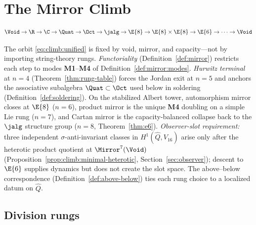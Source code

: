 \section{The Mirror Climb}
\label{sec:climb}

\begin{equation}\label{eq:climb:unified}
  \Void\to\R\to\C\to\Quat\to\Oct\to\jalg\to\E{8}\to\E{8}\times\E{8}\to\E{6}\to\cdots\to\Void
\end{equation}

\begin{remark}\label{rem:climb:forced}
The orbit \eqref{eq:climb:unified} is fixed by void, mirror, and capacity---not
by importing string-theory rungs. \emph{Functoriality}
(Definition~\ref{def:mirror}) restricts each step to modes
\textbf{M1}--\textbf{M4} of Definition~\ref{def:mirror:modes}. \emph{Hurwitz
terminal} at $n=4$ (Theorem~\ref{thm:rung-table}) forces the Jordan exit at
$n=5$ and anchors the associative subalgebra $\Quat\subset\Oct$ used below in
soldering (Definition~\ref{def:soldering}). On the stabilized Albert tower,
automorphism mirror closes at $\E{8}$ ($n=6$), product mirror is the unique
\textbf{M4} doubling on a simple Lie rung ($n=7$), and Cartan mirror is the
capacity-balanced collapse back to the $\jalg$ structure group ($n=8$,
Theorem~\ref{thm:e6}). \emph{Observer-slot requirement:} three independent
$\sigma$-anti-invariant classes in $H^1(\hat Q,V_{16})$ arise only after the
heterotic product quotient at $\Mirror^7(\Void)$ (Proposition~\ref{prop:climb:minimal-heterotic},
Section~\ref{sec:observer}); descent to $\E{6}$ supplies dynamics but does not
create the slot space. The above--below correspondence
(Definition~\ref{def:above-below}) ties each rung choice to a localized datum on
$\hat Q$.
\end{remark}

\subsection{Division rungs}
\label{sec:climb:division}

